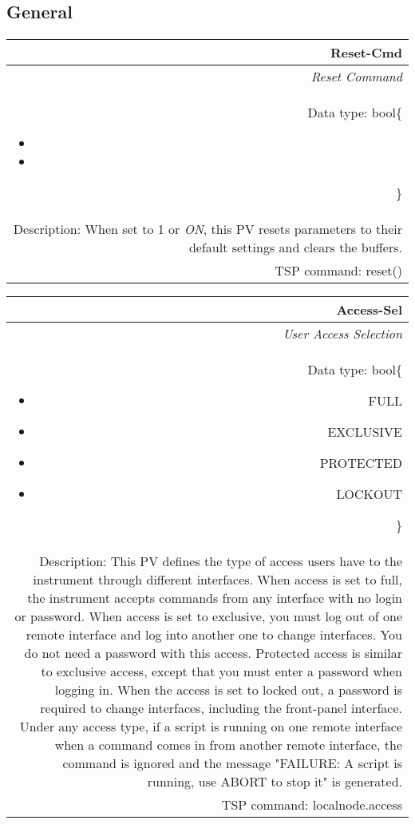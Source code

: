 \documentclass[openany]{article}
\begin{document}
	\subsection{General}\label{pvgroup:general}

		\paragraph{} %

		\begin{tabular}{N}
			\hline
			\bfseries Reset-Cmd\label{pv:reset-cmd} \\ \hline
			\emph{Reset Command} \\
			Data type: bool\{\begin{itemize}[noitemsep]
				\small
				\item[] 
				\item[] 
			\end{itemize}\} \\
			Description: When set to 1 or \emph{ON}, this PV resets parameters to their default settings and clears the buffers. \\
			TSP command: reset()
		\end{tabular}

		\begin{tabular}{N}
			\hline
			\bfseries Access-Sel\label{pv:access-sel} \\ \hline
			\emph{User Access Selection} \\
			Data type: bool\{\begin{itemize}[noitemsep]
				\small
				\item[] FULL
				\item[] EXCLUSIVE
				\item[] PROTECTED
				\item[] LOCKOUT
			\end{itemize}\} \\
			Description: This PV defines the type of access users have to the instrument through different interfaces. When access is set to full, the instrument accepts commands from any interface with no login or password. When access is set to exclusive, you must log out of one remote interface and log into another one to change interfaces. You do not need a password with this access. Protected access is similar to exclusive access, except that you must enter a password when logging in. When the access is set to locked out, a password is required to change interfaces, including the front-panel interface. Under any access type, if a script is running on one remote interface when a command comes in from another remote interface, the command is ignored and the message "FAILURE: A script is running, use ABORT to stop it" is generated. \\
			TSP command: localnode.access
		\end{tabular}
\end{document}
